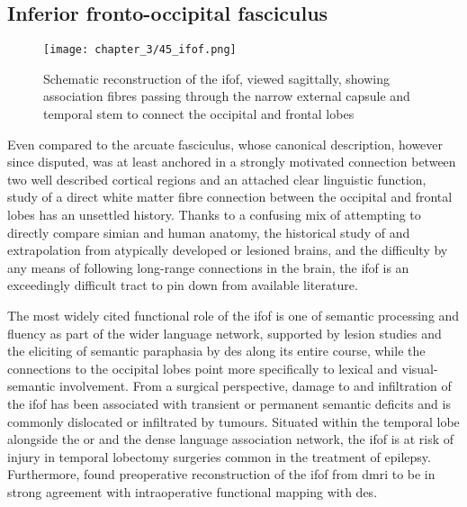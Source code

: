 \subsection{Inferior fronto-occipital fasciculus}


\begin{SCfigure}[][htb!]
  \texttt{[image: chapter\_3/45\_ifof.png]}
  \caption{Schematic reconstruction of the \gls{ifof}, viewed sagittally, showing association fibres passing through the narrow external capsule and temporal stem to connect the occipital and frontal lobes}
  \label{fig:ifof}
\end{SCfigure}

Even compared to the arcuate fasciculus, whose canonical description, however since disputed, was at least anchored in a strongly motivated connection between two well described cortical regions and an attached clear linguistic function, study of a direct white matter fibre connection between the occipital and frontal lobes has an unsettled history.\autocite{Forkel2014a}
Thanks to a confusing mix of attempting to directly compare simian and human anatomy,\autocite{Schmahmann2007,ThiebautdeSchotten2012,Mandonnet2018,Sarubbo2019} the historical study of and extrapolation from atypically developed or lesioned brains,\autocite{Schmahmann2007,Forkel2014a} and the difficulty by any means of following long-range connections in the brain,
\autocite{Martino2010} the \gls{ifof} is an exceedingly difficult tract to pin down from available literature.\autocite{Sarubbo2019,Weiller2021}

The most widely cited functional role of the \gls{ifof} is one of semantic processing and fluency as part of the wider language network, supported by lesion studies\autocite{Ille2018b,Almairac2015} and the eliciting of semantic paraphasia by \gls{des} along its entire course,\autocite{Duffau2013a,Herbet2017,Voets2017,Vigren2020a} while the connections to the occipital lobes point more specifically to lexical and visual-semantic involvement.
\autocite{Martino2010,Rollans2017,Rollans2018}
From a surgical perspective, damage to and infiltration of the \gls{ifof} has been associated with transient or permanent semantic deficits and is commonly dislocated or infiltrated by tumours. \autocite{Almairac2015,Voets2017,Altieri2019,Binding2023}
Situated within the temporal lobe alongside the \gls{or} and the dense language association network, the \gls{ifof} is at risk of injury in temporal lobectomy surgeries common in the treatment of epilepsy. \autocite{Baran2020,Shah2022,Binding2023}
Furthermore, \textcite{Bello2010d} found preoperative reconstruction of the \gls{ifof} from \gls{dmri} to be in strong agreement with intraoperative functional mapping with \gls{des}.

